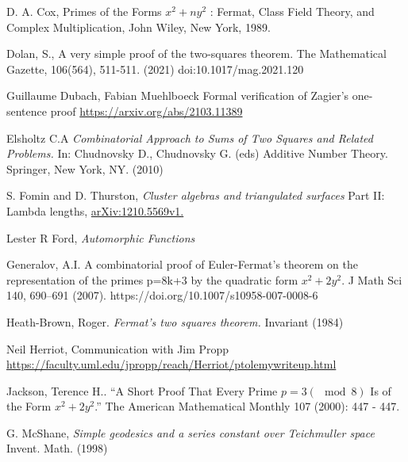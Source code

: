 \documentclass[12pt,a4paper]{amsart}
\begin{document}

 D. A. Cox, Primes of the Forms $x^2 + ny^2$
: Fermat, Class Field Theory, and
Complex Multiplication, John Wiley, New York, 1989.

Dolan, S., A very simple proof of the two-squares theorem. The Mathematical Gazette, 106(564), 511-511. (2021) doi:10.1017/mag.2021.120

Guillaume Dubach, Fabian Muehlboeck
Formal verification of Zagier's one-sentence proof
\url{https://arxiv.org/abs/2103.11389}

Elsholtz C.A 
\textit{Combinatorial Approach to Sums of Two Squares and Related Problems.}
 In: Chudnovsky D., Chudnovsky G. (eds) Additive Number Theory. Springer, New York, NY.
 (2010) 

S. Fomin and D. Thurston,
\textit{Cluster algebras and triangulated surfaces}
Part II: Lambda lengths, \url{arXiv:1210.5569v1.}

Lester R Ford,
\textit{Automorphic Functions}

Generalov, A.I. A combinatorial proof of Euler-Fermat’s theorem on the representation of the primes p=8k+3 by the quadratic form $x^2 + 2y^2$. J Math Sci 140, 690–691 (2007). https://doi.org/10.1007/s10958-007-0008-6

Heath-Brown, Roger. 
\textit{ Fermat’s two squares theorem.} Invariant (1984) 

Neil Herriot, Communication with Jim Propp
\url{https://faculty.uml.edu/jpropp/reach/Herriot/ptolemywriteup.html}

Jackson, Terence H.. “A Short Proof That Every Prime $p = 3 (\mod 8)$
Is of the Form $x^2 + 2y^2$.” The American Mathematical Monthly 107 (2000): 447 - 447.




G. McShane,
\textit{Simple geodesics and a series constant over Teichmuller space}
Invent. Math. (1998)
\end{document}
